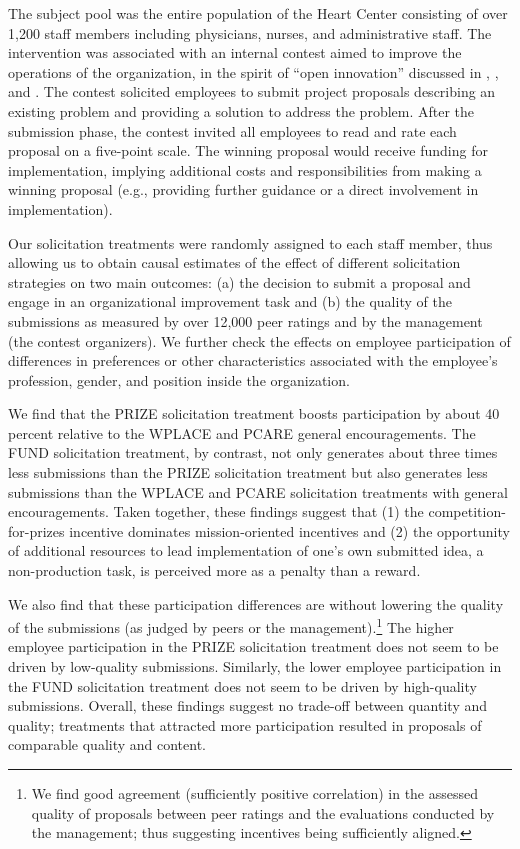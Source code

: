 \documentclass[12pt, titlepage]{article}
\begin{document}
The subject pool was the entire population of the Heart Center
consisting of over 1,200 staff members including physicians, nurses, and
administrative staff. The intervention was associated with an internal
contest aimed to improve the operations of the organization, in the
spirit of ``open innovation'' discussed in
\citet{terwiesch2008innovation}, \citet{lakhani2013prize}, and
\citet{glaeser2016predictive}. The contest solicited employees to submit
project proposals describing an existing problem and providing a
solution to address the problem. After the submission phase, the contest
invited all employees to read and rate each proposal on a five-point
scale. The winning proposal would receive funding for implementation,
implying additional costs and responsibilities from making a winning
proposal (e.g., providing further guidance or a direct involvement in
implementation).

Our solicitation treatments were randomly assigned to each staff member,
thus allowing us to obtain causal estimates of the effect of different
solicitation strategies on two main outcomes: (a) the decision to submit
a proposal and engage in an organizational improvement task and (b) the
quality of the submissions as measured by over 12,000 peer ratings and
by the management (the contest organizers). We further check the effects
on employee participation of differences in preferences or other
characteristics associated with the employee's profession, gender, and
position inside the organization.

We find that the PRIZE solicitation treatment boosts participation by
about 40 percent relative to the WPLACE and PCARE general
encouragements. The FUND solicitation treatment, by contrast, not only
generates about three times less submissions than the PRIZE solicitation
treatment but also generates less submissions than the WPLACE and PCARE
solicitation treatments with general encouragements. Taken together,
these findings suggest that (1) the competition-for-prizes incentive
dominates mission-oriented incentives and (2) the opportunity of
additional resources to lead implementation of one's own submitted idea,
a non-production task, is perceived more as a penalty than a reward.

We also find that these participation differences are without lowering
the quality of the submissions (as judged by peers or the
management).\footnote{We find good agreement (sufficiently positive
  correlation) in the assessed quality of proposals between peer ratings
  and the evaluations conducted by the management; thus suggesting
  incentives being sufficiently aligned.} The higher employee
participation in the PRIZE solicitation treatment does not seem to be
driven by low-quality submissions. Similarly, the lower employee
participation in the FUND solicitation treatment does not seem to be
driven by high-quality submissions. Overall, these findings suggest no
trade-off between quantity and quality; treatments that attracted more
participation resulted in proposals of comparable quality and content.
\end{document}
